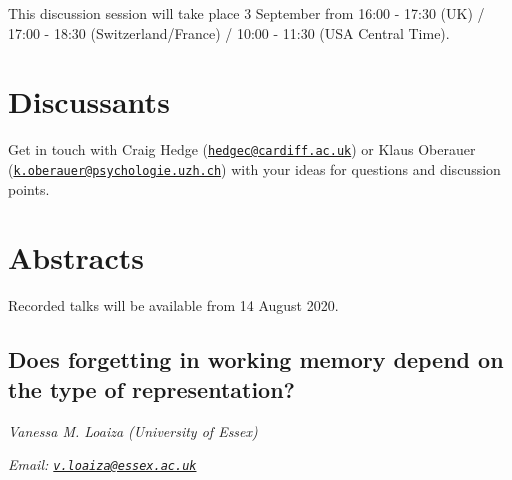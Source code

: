 \documentclass[
  12pt,
]{book}
\begin{document}
This discussion session will take place 3 September from 16:00 - 17:30 (UK) / 17:00 - 18:30 (Switzerland/France) / 10:00 - 11:30 (USA Central Time).

\hypertarget{discussants-5}{%
\section{Discussants}\label{discussants-5}}

Get in touch with Craig Hedge (\href{mailto:hedgec@cardiff.ac.uk}{\nolinkurl{hedgec@cardiff.ac.uk}}) or Klaus Oberauer (\href{mailto:k.oberauer@psychologie.uzh.ch}{\nolinkurl{k.oberauer@psychologie.uzh.ch}}) with your ideas for questions and discussion points.

\hypertarget{abstracts-5}{%
\section{Abstracts}\label{abstracts-5}}

Recorded talks will be available from 14 August 2020.

\hypertarget{does-forgetting-in-working-memory-depend-on-the-type-of-representation}{%
\subsection{Does forgetting in working memory depend on the type of representation?}\label{does-forgetting-in-working-memory-depend-on-the-type-of-representation}}

\emph{Vanessa M. Loaiza (University of Essex)}

\emph{Email: \href{mailto:v.loaiza@essex.ac.uk}{\nolinkurl{v.loaiza@essex.ac.uk}}}
\end{document}
